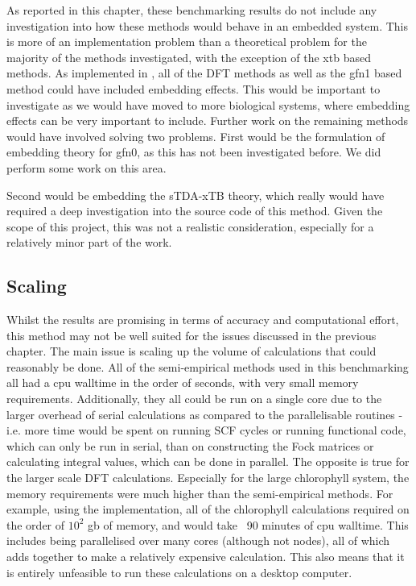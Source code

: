 As reported in this chapter, these benchmarking results do not include any investigation
into how these methods would behave in an embedded system. This is more of an 
implementation problem than a theoretical problem for the majority of the methods
investigated, with the exception of the xtb based methods.
As implemented in , all of the DFT methods as well as the gfn1 based
method could have included embedding effects. This would be important to investigate
as we would have moved to more biological systems, where embedding effects can be
very important to include.
Further work on the remaining methods would have involved solving two problems. First would
be the formulation of embedding theory for gfn0, as this has not been investigated
before. We did perform some work on this area.

Second would be embedding the sTDA-xTB theory, which really would have required 
a deep investigation into the source code of this method. Given the scope of this
project, this was not a realistic consideration, especially for a relatively minor
part of the work.

\subsection{Scaling}
\label{subsec:dscf_scaling}

Whilst the \dscf results are promising in terms of accuracy and computational 
effort, this method may not be well suited for the issues discussed in the previous
chapter. The main issue is scaling up the volume of calculations that could reasonably
be done.
All of the semi-empirical methods used in this benchmarking all had a cpu walltime 
in the order of seconds, with very small memory requirements. Additionally, they
all could be run on a single core due to the larger overhead of serial calculations
as compared to the parallelisable routines - i.e. more time would be spent on running
SCF cycles or running functional code, which can only be run in serial, than on
constructing the Fock matrices or calculating integral values, which can be done in
parallel.
The opposite is true for the larger scale DFT calculations. Especially for the large
chlorophyll system, the memory requirements were much higher than the semi-empirical
methods. For example, using the  implementation, all of the chlorophyll 
calculations required on the order of $10^2$ gb of memory, and would take ~90 minutes
of cpu walltime. This includes being parallelised over many cores (although not
nodes), all of which adds together to make a relatively expensive calculation. This
also means that it is entirely unfeasible to run these calculations on a desktop
computer.

